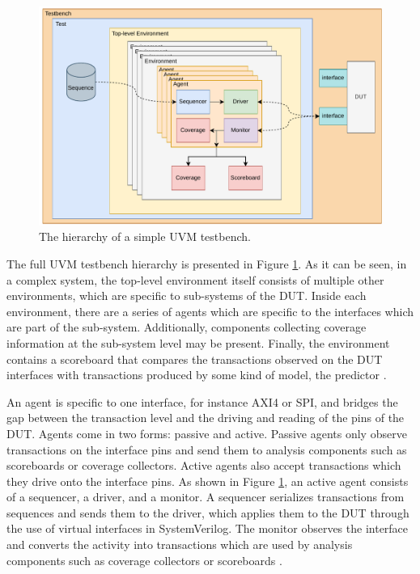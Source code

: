 \begin{figure}
  \centering
  \includegraphics[width=\textwidth]{diagrams/uvm_structure.pdf}
  \caption{The hierarchy of a simple UVM testbench.}
  \label{fig:uvm_tb}
\end{figure}

The full UVM testbench hierarchy is presented in Figure \ref{fig:uvm_tb}. As it can be seen, in a complex system, the
top-level environment itself consists of multiple other environments, which are specific to sub-systems of the DUT.
Inside each environment, there are a series of agents which are specific to the interfaces which are part of the
sub-system. Additionally, components collecting coverage information at the sub-system level may be present. Finally,
the environment contains a scoreboard that compares the transactions observed on the DUT interfaces with
transactions produced by some kind of model, the predictor \cite{UVM12}.

An agent is specific to one interface, for instance AXI4 or SPI, and bridges the gap between the transaction level
and the driving and reading of the pins of the DUT. Agents come in two forms: passive and active. Passive agents only
observe transactions on the interface pins and send them to analysis components such as scoreboards or coverage
collectors. Active agents also accept transactions which they drive onto the interface pins. As shown in Figure
\ref{fig:uvm_tb}, an active agent consists of a sequencer, a driver, and a monitor. A sequencer serializes
transactions from sequences and sends them to the driver, which applies them to the DUT through the use of virtual
interfaces in SystemVerilog. The monitor observes the interface and converts the activity into transactions which are
used by analysis components such as coverage collectors or scoreboards \cite[ch. 4.3]{mehta2018asic}.

